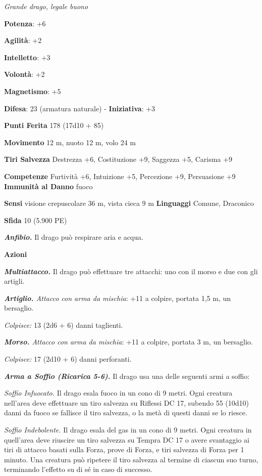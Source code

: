 \begin{multicols}{2}
\emph{Grande drago, legale buono}

\textbf{Potenza}: +6

\textbf{Agilità}: +2

\textbf{Intelletto}: +3

\textbf{Volontà}: +2

\textbf{Magnetismo}: +5

\textbf{Difesa}: 23 (armatura naturale) - \textbf{Iniziativa}: +3

\textbf{Punti Ferita} 178 (17d10 + 85)

\textbf{Movimento} 12 m, nuoto 12 m, volo 24 m

\textbf{Tiri Salvezza} Destrezza +6, Costituzione +9, Saggezza +5,
Carisma +9

\textbf{Competenze} Furtività +6, Intuizione +5, Percezione +9, Persuasione
+9 \textbf{Immunità al Danno} fuoco

\textbf{Sensi} visione crepuscolare 36 m, vista cieca 9 m
\textbf{Linguaggi} Comune, Draconico

\textbf{Sfida} 10 (5.900 PE)

\emph{\textbf{Anfibio.}} Il drago può respirare aria e acqua.

\textbf{Azioni}

\emph{\textbf{Multiattacco.}} Il drago può effettuare tre attacchi: uno
con il morso e due con gli artigli.

\emph{\textbf{Artiglio.} Attacco con arma da mischia}: +11 a colpire,
portata 1,5 m, un bersaglio.

\emph{Colpisce:} 13 (2d6 + 6) danni taglienti.

\emph{\textbf{Morso.} Attacco con arma da mischia}: +11 a colpire,
portata 3 m, un bersaglio.

\emph{Colpisce:} 17 (2d10 + 6) danni perforanti.

\emph{\textbf{Arma a Soffio (Ricarica 5-6).}} Il drago usa una delle
seguenti armi a soffio:

\emph{Soffio Infuocato.} Il drago esala fuoco in un cono di 9 metri.
Ogni creatura nell'area deve effettuare un tiro salvezza su Riflessi DC
17, subendo 55 (10d10) danni da fuoco se fallisce il tiro salvezza, o la
metà di questi danni se lo riesce.

\emph{Soffio Indebolente.} Il drago esala del gas in un cono di 9 metri.
Ogni creatura in quell'area deve riuscire un tiro salvezza su Tempra DC
17 o avere svantaggio ai tiri di attacco basati sulla Forza, prove di
Forza, e tiri salvezza di Forza per 1 minuto. Una creatura può ripetere
il tiro salvezza al termine di ciascun suo turno, terminando l'effetto
su di sé in caso di successo.


\end{multicols}
